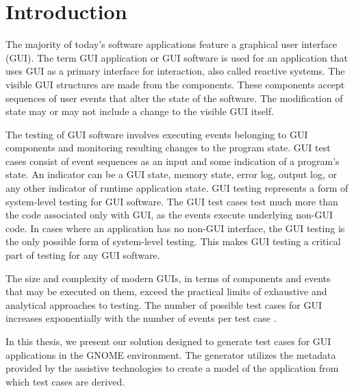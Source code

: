 
\chapter{Introduction}
The majority of today's software applications feature a graphical user interface (GUI). The term GUI application or GUI software is used for an application that uses GUI as a primary interface for interaction, also called reactive systems. The visible GUI structures are made from the components. These components accept sequences of user events that alter the state of the software. The modification of state may or may not include a change to the visible GUI itself. 

The testing of GUI software involves executing events belonging to GUI components and monitoring resulting changes to the program state. GUI test cases consist of event sequences as an input and some indication of a program's state. An indicator can be a GUI state, memory state, error log, output log, or any other indicator of runtime application state. GUI testing represents a form of system-level testing for GUI software. The GUI test cases test much more than the code associated only with GUI, as the events execute underlying non-GUI code. In cases where an application has no non-GUI interface, the GUI testing is the only possible form of system-level testing. This makes GUI testing a critical part of testing for any GUI software.

The size and complexity of modern GUIs, in terms of components and events that may be executed on them, exceed the practical limits of exhaustive and analytical approaches to testing. The number of possible test cases for GUI increases exponentially with the number of events per test case \cite{NguyenBao2014Gait}.

In this thesis, we present our solution designed to generate test cases for GUI applications in the GNOME environment. The generator utilizes the metadata provided by the assistive technologies to create a model of the application from which test cases are derived. 

